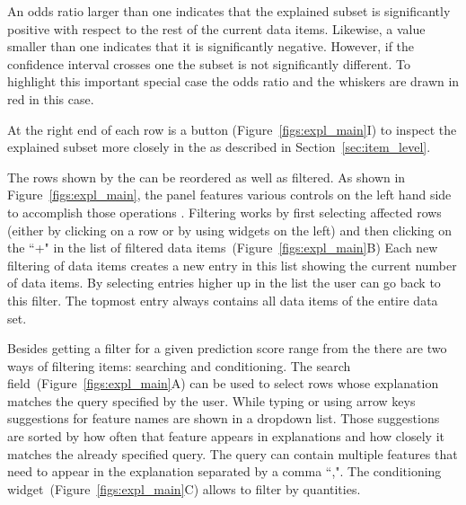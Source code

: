 An odds ratio larger than one indicates that the explained subset is significantly positive with respect to the rest of the current data items.
Likewise, a value smaller than one indicates that it is significantly negative.
However, if the confidence interval crosses one the subset is not significantly different.
To highlight this important special case the odds ratio and the whiskers are drawn in red in this case.

At the right end of each row is a button (Figure~\ref{figs:expl_main}I) to inspect the explained subset more closely in the \tabC as described in Section~\ref{sec:item_level}.

% 



The rows shown by the \tabB can be reordered as well as filtered.
As shown in Figure~\ref{figs:expl_main}, the panel features various controls on the left hand side to accomplish those operations .
Filtering works by first selecting affected rows (either by clicking on a row or by using widgets on the left) and then clicking on the ``+" in the list of filtered data items~(Figure~\ref{figs:expl_main}B)
Each new filtering of data items creates a new entry in this list showing the current number of data items.
By selecting entries higher up in the list the user can go back to this filter.
The topmost entry always contains all data items of the entire data set.

Besides getting a filter for a given prediction score range from the \tabA there are two ways of filtering items: searching and conditioning.
The search field~(Figure~\ref{figs:expl_main}A) can be used to select rows whose explanation matches the query specified by the user.
While typing or using arrow keys suggestions for feature names are shown in a dropdown list.
Those suggestions are sorted by how often that feature appears in explanations and how closely it matches the already specified query.
The query can contain multiple features that need to appear in the explanation separated by a comma ``,".
The conditioning widget~(Figure~\ref{figs:expl_main}C) allows to filter by quantities.



